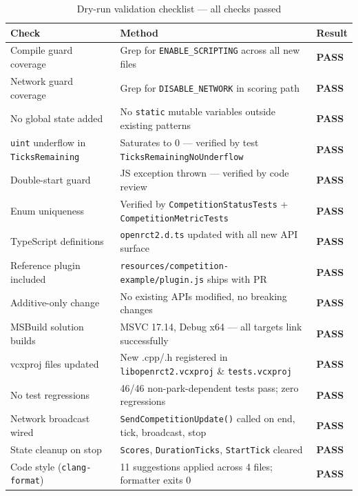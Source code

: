 \documentclass[12pt,a4paper]{article}
\begin{document}
\begin{table}[h!]
\centering
\begin{tabularx}{\linewidth}{lXl}
\toprule
\textbf{Check} & \textbf{Method} & \textbf{Result} \\
\midrule
Compile guard coverage & Grep for \texttt{ENABLE\_SCRIPTING} across all new files & \textcolor{passgreen}{\textbf{PASS}} \\
Network guard coverage & Grep for \texttt{DISABLE\_NETWORK} in scoring path & \textcolor{passgreen}{\textbf{PASS}} \\
No global state added & No \texttt{static} mutable variables outside existing patterns & \textcolor{passgreen}{\textbf{PASS}} \\
\texttt{uint} underflow in \texttt{TicksRemaining} & Saturates to 0 --- verified by test \texttt{TicksRemainingNoUnderflow} & \textcolor{passgreen}{\textbf{PASS}} \\
Double-start guard & JS exception thrown --- verified by code review & \textcolor{passgreen}{\textbf{PASS}} \\
Enum uniqueness & Verified by \texttt{CompetitionStatusTests} + \texttt{CompetitionMetricTests} & \textcolor{passgreen}{\textbf{PASS}} \\
TypeScript definitions & \texttt{openrct2.d.ts} updated with all new API surface & \textcolor{passgreen}{\textbf{PASS}} \\
Reference plugin included & \texttt{resources/competition-example/plugin.js} ships with PR & \textcolor{passgreen}{\textbf{PASS}} \\
Additive-only change & No existing APIs modified, no breaking changes & \textcolor{passgreen}{\textbf{PASS}} \\
MSBuild solution builds & MSVC 17.14, Debug x64 --- all targets link successfully & \textcolor{passgreen}{\textbf{PASS}} \\
vcxproj files updated & New .cpp/.h registered in \texttt{libopenrct2.vcxproj} \& \texttt{tests.vcxproj} & \textcolor{passgreen}{\textbf{PASS}} \\
No test regressions & 46/46 non-park-dependent tests pass; zero regressions & \textcolor{passgreen}{\textbf{PASS}} \\
Network broadcast wired & \texttt{SendCompetitionUpdate()} called on end, tick, broadcast, stop & \textcolor{passgreen}{\textbf{PASS}} \\
State cleanup on stop & \texttt{Scores}, \texttt{DurationTicks}, \texttt{StartTick} cleared & \textcolor{passgreen}{\textbf{PASS}} \\
Code style (\texttt{clang-format}) & 11 suggestions applied across 4 files; formatter exits 0 & \textcolor{passgreen}{\textbf{PASS}} \\
\bottomrule
\end{tabularx}
\caption{Dry-run validation checklist --- all checks passed}
\end{table}
\end{document}
